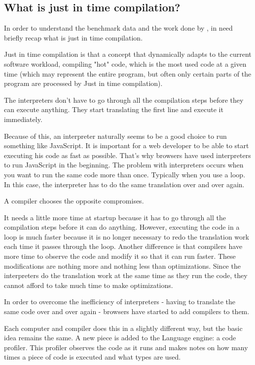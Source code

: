 \documentclass{article}
\begin{document}
\subsection{What is just in time compilation? }

In order to understand the benchmark data and the work done by \cite{barrett2017virtual}, in need briefly recap what is just in time compilation.

Just in time compilation \cite{aycock2003brief} is that a concept that dynamically adapts to the current software workload, compiling "hot" code, which is the most used code at a given time (which may represent the entire program, but often only certain parts of the program are processed by Just in time compilation).

The interpreters don't have to go through all the compilation steps before they can execute anything. They start translating the first line and execute it immediately.

Because of this, an interpreter naturally seems to be a good choice to run something like JavaScript. It is important for a web developer to be able to start executing his code as fast as possible. That's why browsers have used interpreters to run JavaScript in the beginning.
The problem with interpreters occurs when you want to run the same code more than once. Typically when you use a loop. In this case, the interpreter has to do the same translation over and over again.

A compiler chooses the opposite compromises.

It needs a little more time at startup because it has to go through all the compilation steps before it can do anything. However, executing the code in a loop is much faster because it is no longer necessary to redo the translation work each time it passes through the loop.
Another difference is that compilers have more time to observe the code and modify it so that it can run faster. These modifications are nothing more and nothing less than optimizations. Since the interpreters do the translation work at the same time as they run the code, they cannot afford to take much time to make optimizations.

In order to overcome the inefficiency of interpreters - having to translate the same code over and over again - browsers have started to add compilers to them.

Each computer and compiler does this in a slightly different way, but the basic idea remains the same. A new piece is added to the Language engine: a code profiler. This profiler observes the code as it runs and makes notes on how many times a piece of code is executed and what types are used.
\end{document}
